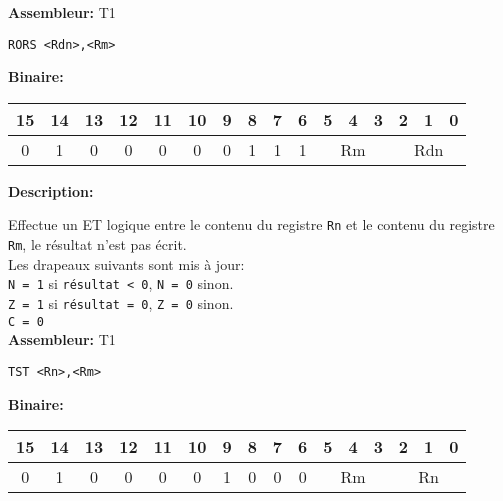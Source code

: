 \textbf{Assembleur:} T1

\begin{lstlisting}
RORS <Rdn>,<Rm>
\end{lstlisting}

\textbf{Binaire:}\\

\begin{tabular}{| c c c c c c c c c c c c c c c c |}
\hline
15 & 14 & 13 & 12 & 11 & 10 & \multicolumn{1}{|c}{9} & 8 & 7 & 6 & \multicolumn{1}{|c}{5} & 4 & 3 & \multicolumn{1}{|c}{2} & 1 & 0 \\
\hline
0 & 1 & 0 & 0 & 0 & 0 & \multicolumn{1}{|c}{0} & 1 & 1 & 1 & \multicolumn{3}{|c}{Rm} & \multicolumn{3}{|c|}{Rdn} \\
\hline
\end{tabular}



\textbf{Description: }

Effectue un ET logique entre le contenu du registre \texttt{Rn} et le contenu du registre \texttt{Rm}, le résultat n'est pas écrit.\\
Les drapeaux suivants sont mis à jour:\\
\texttt{N = 1} si \texttt{résultat < 0}, \texttt{N = 0} sinon.\\
\texttt{Z = 1} si \texttt{résultat = 0}, \texttt{Z = 0} sinon.\\
\texttt{C = 0}\\

\textbf{Assembleur:} T1

\begin{lstlisting}
TST <Rn>,<Rm>
\end{lstlisting}

\textbf{Binaire:}\\

\begin{tabular}{| c c c c c c c c c c c c c c c c |}
\hline
15 & 14 & 13 & 12 & 11 & 10 & \multicolumn{1}{|c}{9} & 8 & 7 & 6 & \multicolumn{1}{|c}{5} & 4 & 3 & \multicolumn{1}{|c}{2} & 1 & 0 \\
\hline
0 & 1 & 0 & 0 & 0 & 0 & \multicolumn{1}{|c}{1} & 0 & 0 & 0 & \multicolumn{3}{|c}{Rm} & \multicolumn{3}{|c|}{Rn} \\
\hline
\end{tabular}




